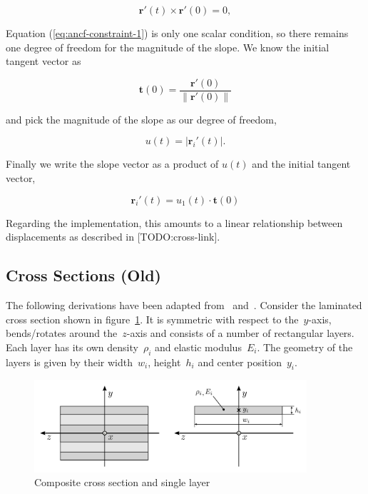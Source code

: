 \begin{equation}
\boldsymbol{r}'(t) \times \boldsymbol{r}'(0) = 0, \label{eq:ancf-constraint-1}
\end{equation}

Equation (\ref{eq:ancf-constraint-1}) is only one scalar condition, so there remains one degree of freedom for the magnitude of the slope.
We know the initial tangent vector as

\begin{equation}
\boldsymbol{t}(0) = \frac{\boldsymbol{r}'(0)}{\lVert\boldsymbol{r}'(0)\rVert}
\end{equation}

and pick the magnitude of the slope as our degree of freedom,

\begin{equation}
u(t) = |\boldsymbol{r}_{i}'(t)|.
\end{equation}

Finally we write the slope vector as a product of $u(t)$ and the initial tangent vector,

\begin{equation}
\boldsymbol{r}_{i}'(t) = u_{1}(t)\cdot\boldsymbol{t}(0)
\end{equation}

Regarding the implementation, this amounts to a linear relationship between displacements as described in [TODO:cross-link].

\newpage
\subsection{Cross Sections (Old)}

The following derivations have been adapted from~\cite{bib:tm2} and~\cite{bib:wiki-sandwich}. Consider the laminated cross section shown in figure~\ref{fig:composite-sections-1}.
It is symmetric with respect to the~$y$-axis, bends/rotates around the~$z$-axis and consists of a number of rectangular layers. Each layer has its own density~$\rho_i$ and elastic modulus~$E_i$.
The geometry of the layers is given by their width~$w_i$, height~$h_i$ and center position~$y_i$.

\begin{figure}[h]
\centering
\includegraphics[width=0.9\textwidth]{figures/elements/composite-sections-1}
\caption{Composite cross section and single layer}
\label{fig:composite-sections-1}
\end{figure}

